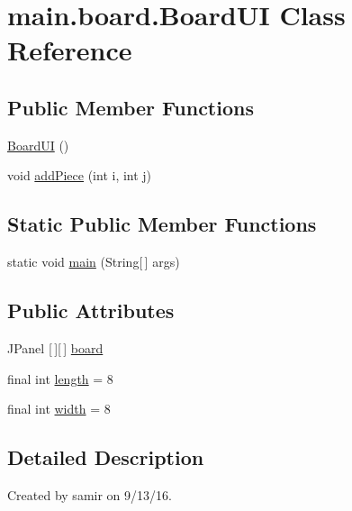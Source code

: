 \hypertarget{classmain_1_1board_1_1_board_u_i}{}\section{main.\+board.\+Board\+UI Class Reference}
\label{classmain_1_1board_1_1_board_u_i}
\subsection*{Public Member Functions}
\begin{DoxyCompactItemize}
\item 
\hyperlink{classmain_1_1board_1_1_board_u_i_a1c893cdd0650369b92f7a4d9b2efe06e}{Board\+UI} ()
\item 
void \hyperlink{classmain_1_1board_1_1_board_u_i_a24a259e0290230e1af5009d8dbfeb9c0}{add\+Piece} (int i, int j)
\end{DoxyCompactItemize}
\subsection*{Static Public Member Functions}
\begin{DoxyCompactItemize}
\item 
static void \hyperlink{classmain_1_1board_1_1_board_u_i_aa762351c28dc367d2c18204f9ef5cf5e}{main} (String\mbox{[}$\,$\mbox{]} args)
\end{DoxyCompactItemize}
\subsection*{Public Attributes}
\begin{DoxyCompactItemize}
\item 
J\+Panel \mbox{[}$\,$\mbox{]}\mbox{[}$\,$\mbox{]} \hyperlink{classmain_1_1board_1_1_board_u_i_aa0e5711381d8309b3dbd16b5bd74a87b}{board}
\item 
final int \hyperlink{classmain_1_1board_1_1_board_u_i_af55bf92762657b51feff3560064e0fa4}{length} = 8
\item 
final int \hyperlink{classmain_1_1board_1_1_board_u_i_a0b6bd608302c1ae92fbb62cfb58f7821}{width} = 8
\end{DoxyCompactItemize}


\subsection{Detailed Description}
Created by samir on 9/13/16. 

